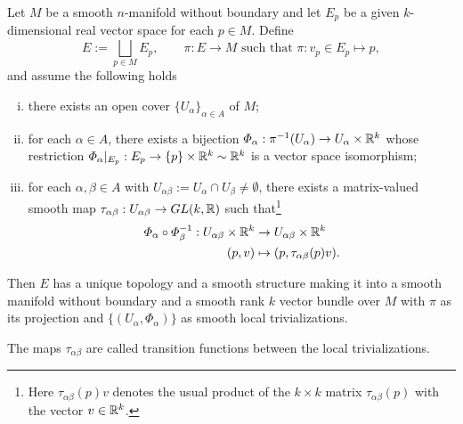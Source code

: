 \begin{theorem}\label{thm:bundle_chart_thm}
  Let $M$ be a smooth $n$-manifold without boundary and let $E_p$ be a given $k$-dimensional real vector space for each $p\in M$.
  Define
  \begin{equation}
    E := \bigsqcup_{p\in M} E_p, \qquad
    \pi : E\to M \mbox{ such that } \pi : v_p \in E_p \mapsto p,
  \end{equation}
  and assume the following holds
  \begin{enumerate}[(i)]
    \item there exists an open cover $\{U_\alpha\}_{\alpha\in A}$ of $M$;
    \item for each $\alpha\in A$, there exists a bijection $\varPhi_\alpha: \pi^{-1}(U_\alpha) \to U_\alpha\times\mathbb{R}^k$ whose restriction $\varPhi_\alpha|_{E_p} : E_p \to \{p\}\times\mathbb{R}^k \sim \mathbb{R}^k$ is a vector space isomorphism;
    \item for each $\alpha,\beta \in A$ with $U_{\alpha\beta}:=U_\alpha \cap U_\beta \neq \emptyset$, there exists a matrix-valued smooth map $\tau_{\alpha\beta}: U_{\alpha\beta} \to GL(k,\mathbb{R})$ such that\footnote{Here $\tau_{\alpha\beta}(p) v$ denotes the usual product of the $k\times k$ matrix $\tau_{\alpha\beta}(p)$ with the vector $v\in\mathbb{R}^k$.}
      \begin{align}
        \varPhi_\alpha \circ \varPhi_\beta^{-1} : U_{\alpha\beta}\times\mathbb{R}^k &\to U_{\alpha\beta}\times\mathbb{R}^k\\
                                                  (p, v) & \mapsto (p, \tau_{\alpha\beta}(p) v).
      \end{align}
  \end{enumerate}
  Then $E$ has a unique topology and a smooth structure making it into a smooth manifold without boundary and a smooth rank $k$ vector bundle over $M$ with $\pi$ as its projection and $\{(U_\alpha, \varPhi_\alpha)\}$ as smooth local trivializations.
\end{theorem}
The maps $\tau_{\alpha\beta}$ are called transition functions between the local trivializations.
